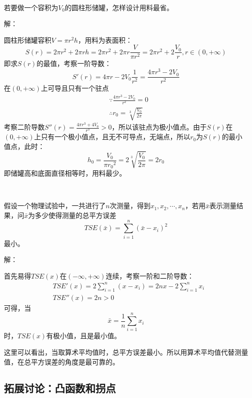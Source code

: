 ~

\begin{example}
若要做一个容积为$V_0$的圆柱形储罐，怎样设计用料最省。
\end{example}

解：

圆柱形储罐容积$V=\pi r^2h$，用料为表面积：
\[
S\left( r \right) =2\pi r^2+2\pi rh=2\pi r^2+2\pi r\frac{V}{\pi r^2}=2\pi r^2+2\frac{V_0}{r},    r\in \left( 0,+\infty \right)
\]
即求$S\left( r \right) $的最值，考察一阶导数：
\[
S'\left( r \right) =4\pi r-2V_0\frac{1}{r^2}=\frac{4\pi r^3-2V_0}{r^2}
\]
在$\left( 0,+\infty \right) $上可导且只有一个驻点
\begin{align*}
&\because \frac{4\pi r^3-2V_0}{r^2}=0 \\
&\therefore r_0=\sqrt[3]{\frac{V_0}{2\pi}}
\end{align*}
考察二阶导数$S''\left( r \right) =\frac{4\pi r^3+4V_0}{r^3}>0$，所以该驻点为极小值点。由于$S\left( r \right) $在$\left( 0,+\infty \right) $上只有一个极小值点，且无不可导点，无端点，所以$r_0$为$S\left( r \right) $的最小值点，此时：
\[
h_0=\frac{V_0}{\pi {r_0}^2}=2\sqrt[3]{\frac{V_0}{2\pi}}=2r_0
\]
即储罐高和底面直径相等时，用料最少。

~

\begin{example}
假设一个物理试验中，一共进行了$n$次测量，得到$x_1,x_2,\cdots ,x_n$，若用$\bar{x}$表示测量结果，问$\bar{x}$为多少使得测量的总平方误差
\[
TSE\left( \bar{x} \right) =\sum_{i=1}^n{\left( \bar{x}-x_i \right) ^2}
\]
最小。
\end{example}

解：

首先易得$TSE\left( x \right) $在$\left( -\infty ,+\infty \right) $连续，考察一阶和二阶导数：
\begin{align*}
&TSE'\left( x \right) =2\sum_{i=1}^n{\left( x-x_i \right)}=2nx-2\sum_{i=1}^n{x_i} \\
&TSE''\left( x \right) =2n>0
\end{align*}
可得，当
\[
\bar{x}=\frac{1}{n}\sum_{i=1}^n{x_i}
\]
时，$TSE\left( x \right) $有极小值，且是最小值。

这里可以看出，当取算术平均值时，总平方误差最小。所以用算术平均值代替测量值，在总平方误差的角度是最可靠的。

\subsection{拓展讨论：凸函数和拐点}

